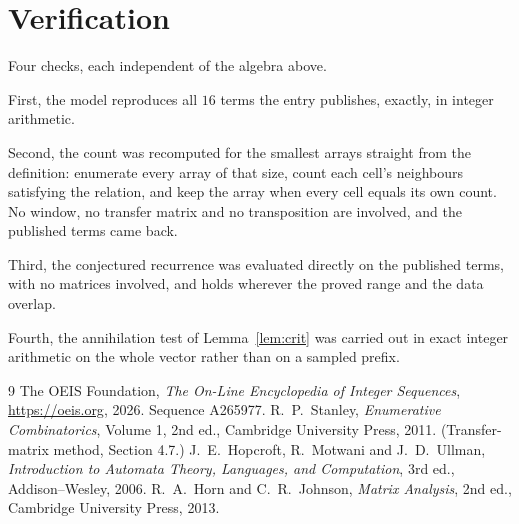 \documentclass[11pt,a4paper]{article}
\theoremstyle{plain}
\theoremstyle{definition}
\begin{document}
\section{Verification}

Four checks, each independent of the algebra above.

First, the model reproduces all $16$ terms the entry publishes, exactly, in integer
arithmetic.

Second, the count was recomputed for the smallest arrays straight from the definition:
enumerate every array of that size, count each cell's neighbours satisfying the relation, and
keep the array when every cell equals its own count. No window, no transfer matrix and no
transposition are involved, and the published terms came back.

Third, the conjectured recurrence was evaluated directly on the published terms, with no
matrices involved, and holds wherever the proved range and the data overlap.

Fourth, the annihilation test of Lemma~\ref{lem:crit} was carried out in exact integer
arithmetic on the whole vector rather than on a sampled prefix.

\begin{thebibliography}{9}
 The OEIS Foundation, \emph{The On-Line Encyclopedia of Integer
Sequences}, \url{https://oeis.org}, 2026. Sequence A265977.
 R.~P.~Stanley, \emph{Enumerative Combinatorics}, Volume 1, 2nd ed.,
Cambridge University Press, 2011. (Transfer-matrix method, Section 4.7.)
 J.~E.~Hopcroft, R.~Motwani and J.~D.~Ullman, \emph{Introduction to Automata
Theory, Languages, and Computation}, 3rd ed., Addison--Wesley, 2006.
 R.~A.~Horn and C.~R.~Johnson, \emph{Matrix Analysis}, 2nd ed., Cambridge
University Press, 2013.
\end{thebibliography}
\end{document}
